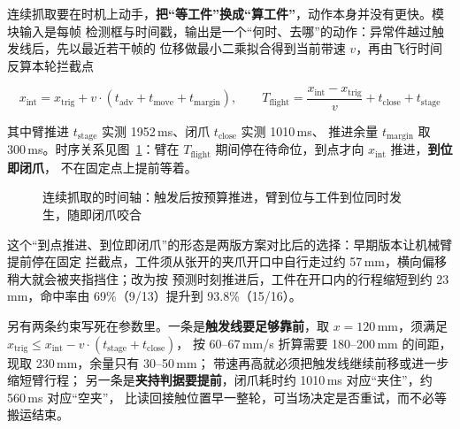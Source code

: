 \documentclass[UTF8,a4paper,zihao=5,fontset=windows]{ctexart}
\begin{document}
连续抓取要在时机上动手，\textbf{把“等工件”换成“算工件”}，动作本身并没有更快。模块输入是每帧
检测框与时间戳，输出是一个“何时、去哪”的动作：异常件越过触发线后，先以最近若干帧的
位移做最小二乘拟合得到当前带速 $v$，再由飞行时间反算本轮拦截点

\begin{equation}
x_{\text{int}} = x_{\text{trig}} + v \cdot (t_{\text{adv}} + t_{\text{move}} + t_{\text{margin}}),
\qquad
T_{\text{flight}} = \frac{x_{\text{int}} - x_{\text{trig}}}{v} + t_{\text{close}} + t_{\text{stage}}
\end{equation}

其中臂推进 $t_{\text{stage}}$ 实测 1952\,ms、闭爪 $t_{\text{close}}$ 实测 1010\,ms、
推进余量 $t_{\text{margin}}$ 取 300\,ms。时序关系见图~\ref{fig:timeline}：臂在
$T_{\text{flight}}$ 期间停在待命位，到点才向 $x_{\text{int}}$ 推进，\textbf{到位即闭爪}，
不在固定点上提前等着。

\begin{figure}[H]\centering
{}
\caption{连续抓取的时间轴：触发后按预算推进，臂到位与工件到位同时发生，随即闭爪咬合}
\label{fig:timeline}
\end{figure}

这个“到点推进、到位即闭爪”的形态是两版方案对比后的选择：早期版本让机械臂提前停在固定
拦截点，工件须从张开的夹爪开口中自行走过约 57\,mm，横向偏移稍大就会被夹指挡住；改为按
预测时刻推进后，工件在开口内的行程缩短到约 23\,mm，命中率由 69\%（9/13）提升到
93.8\%（15/16）。

另有两条约束写死在参数里。一条是\textbf{触发线要足够靠前}，取 $x=120$\,mm，须满足
$x_{\text{trig}} \le x_{\text{int}} - v \cdot (t_{\text{stage}} + t_{\text{close}})$，
按 60--67\,mm/s 折算需要 180--200\,mm 的间距，现取 230\,mm，余量只有 30--50\,mm；
带速再高就必须把触发线继续前移或进一步缩短臂行程；
另一条是\textbf{夹持判据要提前}，闭爪耗时约 1010\,ms 对应“夹住”，约 560\,ms 对应“空夹”，
比读回接触位置早一整轮，可当场决定是否重试，而不必等搬运结束。
\end{document}
